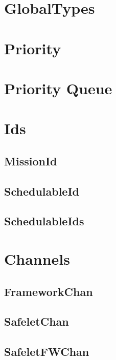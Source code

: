 \documentclass{article}
\begin{document}
\begin{plumbing}
\section{GlobalTypes}

\newpage

\section{Priority}

\newpage

\section{Priority Queue}

\newpage

\section{Ids}
\subsection{MissionId}


\subsection{SchedulableId}

\newpage
\subsection{SchedulableIds}

\newpage

\section{Channels}
\subsection{FrameworkChan}


\subsection{SafeletChan}


\subsection{SafeletFWChan}



\end{plumbing}
\end{document}
